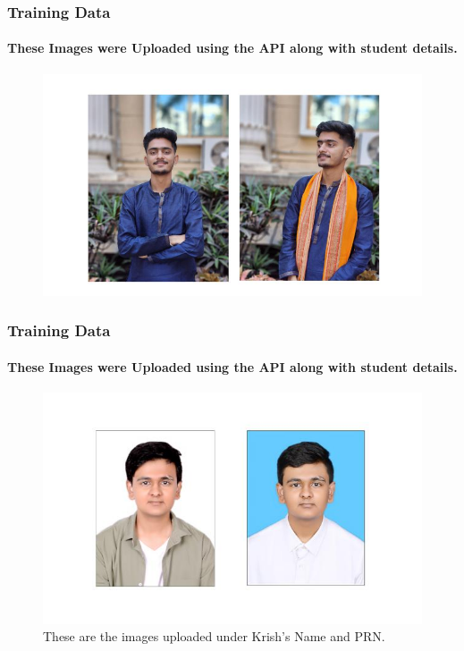 \documentclass[aspectratio=169]{beamer}
\begin{document}
\begin{frame}
	\centering
	\frametitle{Training Data}
	\framesubtitle{These Images were Uploaded using the API along with student details.}
	\begin{minipage}{0.95\textwidth}
		\begin{figure}[H]
			\centering
			\includegraphics[width=.95\textwidth]{karad.jpg}
			\caption{}
		\end{figure}
	\end{minipage}
\end{frame}
\begin{frame}
	\centering
	\frametitle{Training Data}
	\framesubtitle{These Images were Uploaded using the API along with student details.}
	\begin{minipage}{0.95\textwidth}
		\begin{figure}[H]
			\centering
			\includegraphics[width=.65\textwidth]{krish.jpg}
			\caption{These are the images uploaded under Krish's Name and PRN.}
		\end{figure}
	\end{minipage}
\end{frame}
\end{document}
